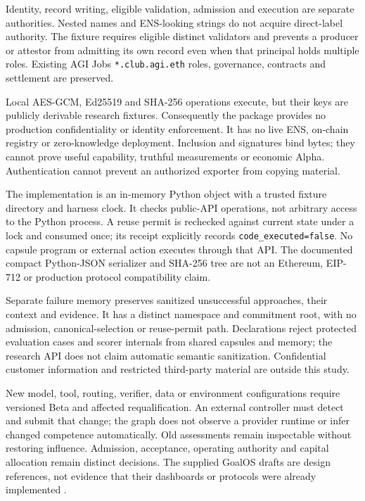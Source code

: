 \documentclass[11pt,letterpaper]{article}
\begin{document}
Identity, record writing, eligible validation, admission and execution are
separate authorities. Nested names and ENS-looking strings do not acquire
direct-label authority. The fixture requires eligible distinct validators and
prevents a producer or attestor from admitting its own record even when that
principal holds multiple roles. Existing AGI Jobs \texttt{*.club.agi.eth} roles,
governance, contracts and settlement are preserved.

Local AES-GCM, Ed25519 and SHA-256 operations execute, but their keys are publicly
derivable research fixtures. Consequently the package provides no production
confidentiality or identity enforcement. It has no live ENS, on-chain registry
or zero-knowledge deployment. Inclusion and signatures bind bytes; they cannot
prove useful capability, truthful measurements or economic Alpha. Authentication
cannot prevent an authorized exporter from copying material.

The implementation is an in-memory Python object with a trusted fixture
directory and harness clock. It checks public-API operations, not arbitrary
access to the Python process. A reuse permit is rechecked against current state
under a lock and consumed once; its receipt explicitly records
\texttt{code\_executed=false}. No capsule program or external action executes
through that API. The documented compact Python-JSON serializer and SHA-256
tree are not an Ethereum, EIP-712 or production protocol compatibility claim.

Separate failure memory preserves sanitized unsuccessful approaches, their
context and evidence. It has a distinct namespace and commitment root, with no
admission, canonical-selection or reuse-permit path. Declarations reject
protected evaluation cases and scorer internals from shared capsules and memory;
the research API does not claim automatic semantic sanitization. Confidential
customer information and restricted third-party material are outside this study.

New model, tool, routing, verifier, data or environment configurations require
versioned Beta and affected requalification. An external controller must detect
and submit that change; the graph does not observe a provider runtime or infer
changed competence automatically. Old assessments remain inspectable
without restoring influence. Admission, acceptance, operating authority and
capital allocation remain distinct decisions. The supplied GoalOS drafts are
design references, not evidence that their dashboards or protocols were already
implemented \citep{merkle,proofloops}.
\end{document}
